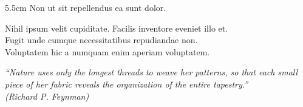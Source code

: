 \documentclass[
	12pt,				%
	oneside,			%
	a4paper,			%
	chapter=TITLE,		%
	section=TITLE,		%
	english,			%
	brazil				%
	]{abntex2}
\begin{document}
\begin{folhadeaprovacao}
	\vspace*{\fill}
	\centering
\end{folhadeaprovacao}

\begin{dedicatoria}
	\vspace*{\fill}
	\noindent
	\begin{adjustwidth*}{}{5.5cm}
		\raggedleft
		Non ut sit repellendus ea sunt dolor.
	\end{adjustwidth*}
\end{dedicatoria}

\begin{agradecimentos}
	Nihil ipsum velit cupiditate. Facilis inventore eveniet illo et.\\
Fugit unde cumque necessitatibus repudiandae non.\\
Voluptatem hic a numquam enim aperiam voluptatem.
\end{agradecimentos}

\begin{epigrafe}
	\vspace*{\fill}
	\begin{flushright}
		\textit{``Nature uses only the longest threads to weave her patterns, so that each small piece of her fabric reveals the organization of the entire tapestry.''\\
(Richard P. Feynman)}
	\end{flushright}
\end{epigrafe}
\end{document}
